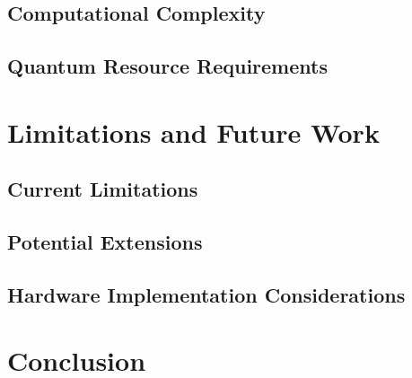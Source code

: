 \documentclass[conference]{IEEEtran}
\begin{document}
\subsection{Computational Complexity}
\subsection{Quantum Resource Requirements}

\section{Limitations and Future Work}
\subsection{Current Limitations}
\subsection{Potential Extensions}
\subsection{Hardware Implementation Considerations}

\section{Conclusion}



\end{document}

